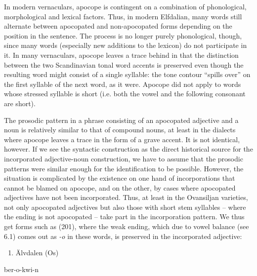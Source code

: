 In modern vernaculars, apocope is contingent on a combination of phonological, morphological and lexical factors. Thus, in modern Elfdalian, many words still alternate between apocopated and non-apocopated forms depending on the position in the sentence. The process is no longer purely phonological, though, since many words (especially new additions to the lexicon) do not participate in it. In many vernaculars, apocope leaves a trace behind in that the distinction between the two Scandinavian tonal word accents is preserved even though the resulting word might consist of a single syllable: the tone contour “spills over” on the first syllable of the next word, as it were. Apocope did not apply to words whose stressed syllable is short (i.e. both the vowel and the following consonant are short).

The prosodic pattern in a phrase consisting of an apocopated adjective and a noun is relatively similar to that of compound nouns, at least in the dialects where apocope leaves a trace in the form of a grave accent. It is not identical, however. If we see the syntactic construction as the direct historical source for the incorporated adjective-noun construction, we have to assume that the prosodic patterns were similar enough for the identification to be possible. However, the situation is complicated by the existence on one hand of incorporations that cannot be blamed on apocope, and on the other, by cases where apocopated adjectives have not been incorporated. Thus, at least in the Ovansiljan varieties, not only apocopated adjectives but also those with short stem syllables – where the ending is not apocopated – take part in the incorporation pattern. We thus get forms such as (201), where the weak ending, which due to vowel balance (see 6.1) comes out as\textit{ {}-o} in these words, is preserved in the incorporated adjective:

\begin{enumerate} %
\item 
\label{bkm:Ref141171937}Älvdalen (Os)

\end{enumerate} %
\ea\label{}
\gll ber-o-kwi-n\\



